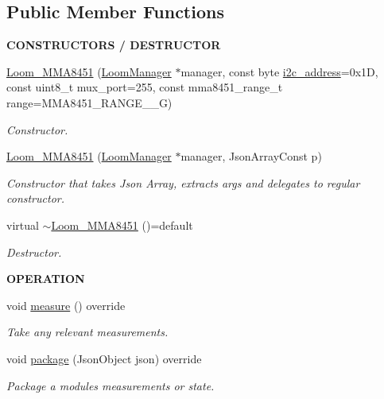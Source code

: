 \subsection*{Public Member Functions}
\begin{Indent}{\bf C\+O\+N\+S\+T\+R\+U\+C\+T\+O\+RS / D\+E\+S\+T\+R\+U\+C\+T\+OR}\par
\begin{DoxyCompactItemize}
\item 
\hyperlink{class_loom___m_m_a8451_a2ca646f0fb9393b08b8025b64f430b50}{Loom\+\_\+\+M\+M\+A8451} (\hyperlink{class_loom_manager}{Loom\+Manager} $\ast$manager, const byte \hyperlink{class_loom_i2_c_sensor_a6ff389c1f015152a9ebfccb037d3d90e}{i2c\+\_\+address}=0x1\+D, const uint8\+\_\+t mux\+\_\+port=255, const mma8451\+\_\+range\+\_\+t range=\+M\+M\+A8451\+\_\+\+R\+A\+N\+G\+E\+\_\+\_\+\+G)
\begin{DoxyCompactList}\small\item\em Constructor. \end{DoxyCompactList}\item 
\hyperlink{class_loom___m_m_a8451_a13c0b9fce23811951912157da4978701}{Loom\+\_\+\+M\+M\+A8451} (\hyperlink{class_loom_manager}{Loom\+Manager} $\ast$manager, Json\+Array\+Const p)
\begin{DoxyCompactList}\small\item\em Constructor that takes Json Array, extracts args and delegates to regular constructor. \end{DoxyCompactList}\item 
virtual \hyperlink{class_loom___m_m_a8451_ab3a956658abfd86efefbb87c3792c83c}{$\sim$\+Loom\+\_\+\+M\+M\+A8451} ()=default
\begin{DoxyCompactList}\small\item\em Destructor. \end{DoxyCompactList}\end{DoxyCompactItemize}
\end{Indent}
\begin{Indent}{\bf O\+P\+E\+R\+A\+T\+I\+ON}\par
\begin{DoxyCompactItemize}
\item 
void \hyperlink{class_loom___m_m_a8451_aa28f476799e177ba1345b04faa121521}{measure} () override
\begin{DoxyCompactList}\small\item\em Take any relevant measurements. \end{DoxyCompactList}\item 
void \hyperlink{class_loom___m_m_a8451_a94a382c80a638f3cba9fb0c7fd4bd232}{package} (Json\+Object json) override
\begin{DoxyCompactList}\small\item\em Package a modules measurements or state. \end{DoxyCompactList}\end{DoxyCompactItemize}
\end{Indent}
